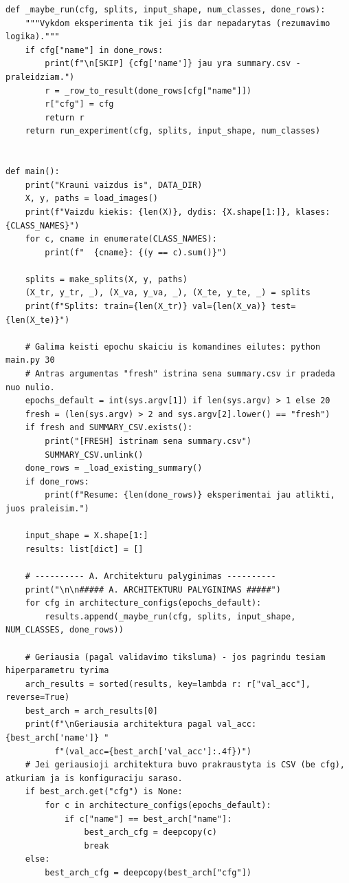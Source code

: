 \documentclass[]{VUMIFTemplateClass}
\begin{document}
\begin{verbatim}
def _maybe_run(cfg, splits, input_shape, num_classes, done_rows):
    """Vykdom eksperimenta tik jei jis dar nepadarytas (rezumavimo logika)."""
    if cfg["name"] in done_rows:
        print(f"\n[SKIP] {cfg['name']} jau yra summary.csv - praleidziam.")
        r = _row_to_result(done_rows[cfg["name"]])
        r["cfg"] = cfg
        return r
    return run_experiment(cfg, splits, input_shape, num_classes)


def main():
    print("Krauni vaizdus is", DATA_DIR)
    X, y, paths = load_images()
    print(f"Vaizdu kiekis: {len(X)}, dydis: {X.shape[1:]}, klases: {CLASS_NAMES}")
    for c, cname in enumerate(CLASS_NAMES):
        print(f"  {cname}: {(y == c).sum()}")

    splits = make_splits(X, y, paths)
    (X_tr, y_tr, _), (X_va, y_va, _), (X_te, y_te, _) = splits
    print(f"Splits: train={len(X_tr)} val={len(X_va)} test={len(X_te)}")

    # Galima keisti epochu skaiciu is komandines eilutes: python main.py 30
    # Antras argumentas "fresh" istrina sena summary.csv ir pradeda nuo nulio.
    epochs_default = int(sys.argv[1]) if len(sys.argv) > 1 else 20
    fresh = (len(sys.argv) > 2 and sys.argv[2].lower() == "fresh")
    if fresh and SUMMARY_CSV.exists():
        print("[FRESH] istrinam sena summary.csv")
        SUMMARY_CSV.unlink()
    done_rows = _load_existing_summary()
    if done_rows:
        print(f"Resume: {len(done_rows)} eksperimentai jau atlikti, juos praleisim.")

    input_shape = X.shape[1:]
    results: list[dict] = []

    # ---------- A. Architekturu palyginimas ----------
    print("\n\n##### A. ARCHITEKTURU PALYGINIMAS #####")
    for cfg in architecture_configs(epochs_default):
        results.append(_maybe_run(cfg, splits, input_shape, NUM_CLASSES, done_rows))

    # Geriausia (pagal validavimo tiksluma) - jos pagrindu tesiam hiperparametru tyrima
    arch_results = sorted(results, key=lambda r: r["val_acc"], reverse=True)
    best_arch = arch_results[0]
    print(f"\nGeriausia architektura pagal val_acc: {best_arch['name']} "
          f"(val_acc={best_arch['val_acc']:.4f})")
    # Jei geriausioji architektura buvo prakraustyta is CSV (be cfg), atkuriam ja is konfiguraciju saraso.
    if best_arch.get("cfg") is None:
        for c in architecture_configs(epochs_default):
            if c["name"] == best_arch["name"]:
                best_arch_cfg = deepcopy(c)
                break
    else:
        best_arch_cfg = deepcopy(best_arch["cfg"])


\end{verbatim}
\end{document}
